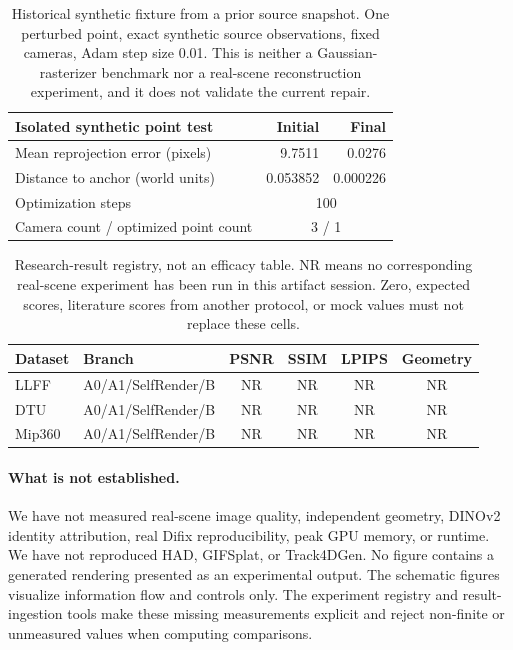 \documentclass[10pt,twocolumn,letterpaper]{article}
\newcommand{\NR}{\textsf{NR}}
\begin{document}
\begin{table}[t]
\centering\small
\begin{tabular}{lrr}
\toprule
Isolated synthetic point test & Initial & Final\\
\midrule
Mean reprojection error (pixels) & 9.7511 & 0.0276\\
Distance to anchor (world units) & 0.053852 & 0.000226\\
Optimization steps & \multicolumn{2}{c}{100}\\
Camera count / optimized point count & \multicolumn{2}{c}{3 / 1}\\
\bottomrule
\end{tabular}
\caption{Historical synthetic fixture from a prior source snapshot. One perturbed point, exact synthetic source observations, fixed cameras, Adam step size 0.01. This is neither a Gaussian-rasterizer benchmark nor a real-scene reconstruction experiment, and it does not validate the current repair.}
\label{tab:synthetic}
\end{table}

\begin{table}[t]
\centering\small
\begin{tabular}{llcccc}
\toprule
Dataset & Branch & PSNR & SSIM & LPIPS & Geometry\\
\midrule
LLFF & A0/A1/SelfRender/B & \NR & \NR & \NR & \NR\\
DTU & A0/A1/SelfRender/B & \NR & \NR & \NR & \NR\\
Mip360 & A0/A1/SelfRender/B & \NR & \NR & \NR & \NR\\
\bottomrule
\end{tabular}
\caption{Research-result registry, not an efficacy table. \NR{} means no corresponding real-scene experiment has been run in this artifact session. Zero, expected scores, literature scores from another protocol, or mock values must not replace these cells.}
\label{tab:registry}
\end{table}

\paragraph{What is not established.} We have not measured real-scene image quality, independent geometry, DINOv2 identity attribution, real Difix reproducibility, peak GPU memory, or runtime. We have not reproduced HAD, GIFSplat, or Track4DGen. No figure contains a generated rendering presented as an experimental output. The schematic figures visualize information flow and controls only. The experiment registry and result-ingestion tools make these missing measurements explicit and reject non-finite or unmeasured values when computing comparisons.
\end{document}
